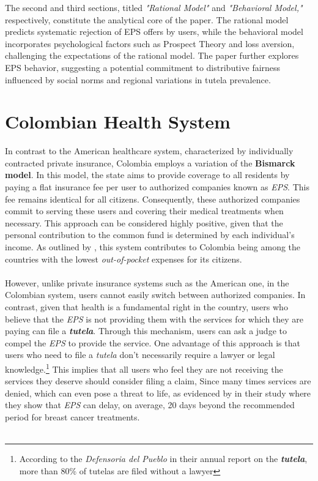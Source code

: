 \documentclass[12pt]{article}
\begin{document}
\begin{flushleft}
    The second and third sections, titled \textit{"Rational Model"} and \textit{"Behavioral Model,"} respectively, constitute the analytical core of the paper. The rational model predicts systematic rejection of EPS offers by users, while the behavioral model incorporates psychological factors such as Prospect Theory and loss aversion, challenging the expectations of the rational model. The paper further explores EPS behavior, suggesting a potential commitment to distributive fairness influenced by social norms and regional variations in tutela prevalence.

\end{flushleft}

\section{Colombian Health System}

\begin{flushleft}

    In contrast to the American healthcare system, characterized by individually contracted private insurance, Colombia employs a variation of the \textbf{Bismarck model}. In this model, the state aims to provide coverage to all residents by paying a flat insurance fee per user to authorized companies known as \textit{EPS}. This fee remains identical for all citizens. Consequently, these authorized companies commit to serving these users and covering their medical treatments when necessary. This approach can be considered highly positive, given that the personal contribution to the common fund is determined by each individual's income. As outlined by \citet{perez2015mirada}, this system contributes to Colombia being among the countries with the lowest \textit{out-of-pocket} expenses for its citizens.\\~\\

    However, unlike private insurance systems such as the American one, in the Colombian system, users cannot easily switch between authorized companies. In contrast, given that health is a fundamental right in the country, users who believe that the \textit{EPS} is not providing them with the services for which they are paying can file a \textit{\textbf{tutela}}. Through this mechanism, users can ask a judge to compel the \textit{EPS} to provide the service. One advantage of this approach is that users who need to file a \textit{tutela} don't necessarily require a lawyer or legal knowledge.\footnote{According to the \textit{Defensoria del Pueblo} in their annual report on the \textit{\textbf{tutela}}, more than 80\% of tutelas are filed without a lawyer}  This implies that all users who feel they are not receiving the services they deserve should consider filing a claim, Since many times services are denied, which can even pose a threat to life, as evidenced by \citet{sanchez2014barreras} in their study where they show that \textit{EPS} can delay, on average, 20 days beyond the recommended period for breast cancer treatments.\\~\\
    
\end{flushleft}
\end{document}

